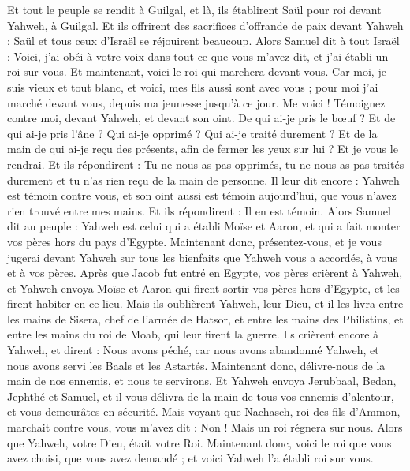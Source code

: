 \begin{multicols}{2}
Et tout le peuple se rendit à Guilgal, et là, ils établirent Saül pour roi devant Yahweh, à Guilgal. Et ils offrirent des sacrifices d'offrande de paix devant Yahweh ; Saül et tous ceux d'Israël se réjouirent beaucoup.
\VerseOne{}Alors Samuel dit à tout Israël : Voici, j'ai obéi à votre voix dans tout ce que vous m'avez dit, et j'ai établi un roi sur vous.
Et maintenant, voici le roi qui marchera devant vous. Car moi, je suis vieux et tout blanc, et voici, mes fils aussi sont avec vous ; pour moi j'ai marché devant vous, depuis ma jeunesse jusqu'à ce jour.
Me voici ! Témoignez contre moi, devant Yahweh, et devant son oint. De qui ai-je pris le bœuf ? Et de qui ai-je pris l'âne ? Qui ai-je opprimé ? Qui ai-je traité durement ? Et de la main de qui ai-je reçu des présents, afin de fermer les yeux sur lui ? Et je vous le rendrai.
Et ils répondirent : Tu ne nous as pas opprimés, tu ne nous as pas traités durement et tu n'as rien reçu de la main de personne.
Il leur dit encore : Yahweh est témoin contre vous, et son oint aussi est témoin aujourd'hui, que vous n'avez rien trouvé entre mes mains. Et ils répondirent : Il en est témoin.
Alors Samuel dit au peuple : Yahweh est celui qui a établi Moïse et Aaron, et qui a fait monter vos pères hors du pays d'Egypte.
Maintenant donc, présentez-vous, et je vous jugerai devant Yahweh sur tous les bienfaits que Yahweh vous a accordés, à vous et à vos pères.
Après que Jacob fut entré en Egypte, vos pères crièrent à Yahweh, et Yahweh envoya Moïse et Aaron qui firent sortir vos pères hors d'Egypte, et les firent habiter en ce lieu.
Mais ils oublièrent Yahweh, leur Dieu, et il les livra entre les mains de Sisera, chef de l'armée de Hatsor, et entre les mains des Philistins, et entre les mains du roi de Moab, qui leur firent la guerre.
Ils crièrent encore à Yahweh, et dirent : Nous avons péché, car nous avons abandonné Yahweh, et nous avons servi les Baals et les Astartés. Maintenant donc, délivre-nous de la main de nos ennemis, et nous te servirons.
Et Yahweh envoya Jerubbaal, Bedan, Jephthé et Samuel, et il vous délivra de la main de tous vos ennemis d'alentour, et vous demeurâtes en sécurité.
Mais voyant que Nachasch, roi des fils d'Ammon, marchait contre vous, vous m'avez dit : Non ! Mais un roi régnera sur nous. Alors que Yahweh, votre Dieu, était votre Roi.
Maintenant donc, voici le roi que vous avez choisi, que vous avez demandé ; et voici Yahweh l'a établi roi sur vous.

\end{multicols}
